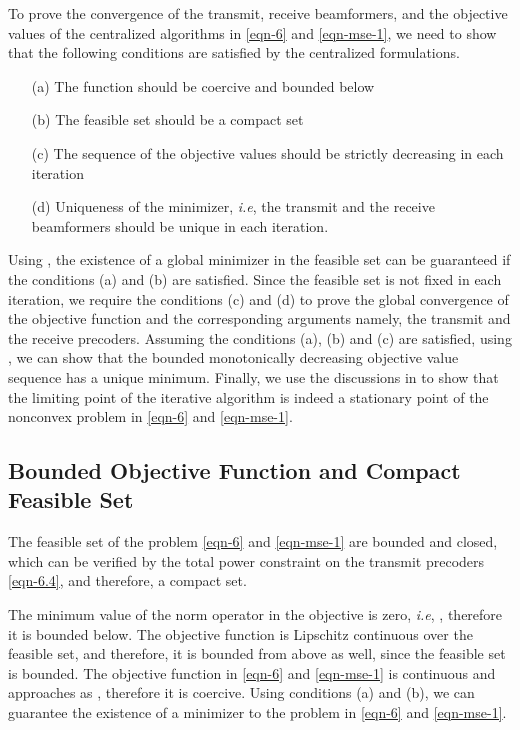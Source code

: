 To prove the convergence of the transmit, receive beamformers, and the objective values of the centralized algorithms in \eqref{eqn-6} and \eqref{eqn-mse-1}, we need to show that the following conditions are satisfied by the centralized formulations.
\begin{itemize}
	\item[(a)] The function should be coercive and bounded below
	\item[(b)] The feasible set should be a compact set
	\item[(c)] The sequence of the objective values should be strictly decreasing in each iteration
	\item[(d)] Uniqueness of the minimizer, \textit{i.e}, the transmit and the receive beamformers should be unique in each iteration.
\end{itemize}
Using \cite[Prop. A.8]{bertsekas1999nonlinear}, the existence of a global minimizer in the feasible set can be guaranteed if the conditions (a) and (b) are satisfied. Since the feasible set is not fixed in each iteration, we require the conditions (c) and (d) to prove the global convergence of the objective function and the corresponding arguments namely, the transmit and the receive precoders. Assuming the conditions (a), (b) and (c) are satisfied, using \cite[Theorem 3.14]{rudin1964principles}, we can show that the bounded monotonically decreasing objective value sequence has a unique minimum. Finally, we use the discussions in \cite{marks1978technical,lanckriet2009convergence,scutari_1} to show that the limiting point of the iterative algorithm is indeed a stationary point of the nonconvex problem in \eqref{eqn-6} and \eqref{eqn-mse-1}.

\subsection{Bounded Objective Function and Compact Feasible Set}
The feasible set of the problem \eqref{eqn-6} and \eqref{eqn-mse-1} are bounded and closed, which can be verified by the total power constraint on the transmit precoders \eqref{eqn-6.4}, and therefore, a compact set. 

The minimum value of the norm operator in the objective is zero, \textit{i.e}, , therefore it is bounded below. The objective function is Lipschitz continuous over the feasible set, and therefore, it is bounded from above as well, since the feasible set is bounded. The objective function in \eqref{eqn-6} and \eqref{eqn-mse-1} is continuous and approaches \me{\infty} as , therefore it is coercive. Using conditions (a) and (b), we can guarantee the existence of a minimizer to the problem in \eqref{eqn-6} and \eqref{eqn-mse-1}.


